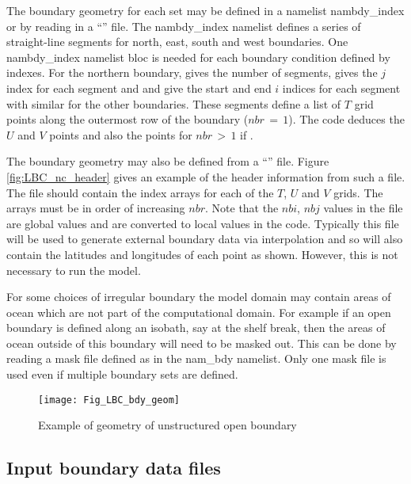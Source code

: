 \documentclass[../main/NEMO_manual]{subfiles}
\begin{document}
The boundary geometry for each set may be defined in a namelist nambdy\_index or
by reading in a ``'' file.
The nambdy\_index namelist defines a series of straight-line segments for north, east, south and west boundaries.
One nambdy\_index namelist bloc is needed for each boundary condition defined by indexes. 
For the northern boundary,  gives the number of segments,
 gives the $j$ index for each segment and  and
 give the start and end $i$ indices for each segment with similar for the other boundaries.
These segments define a list of $T$ grid points along the outermost row of the boundary ($nbr\,=\, 1$).
The code deduces the $U$ and $V$ points and also the points for $nbr\,>\, 1$ if .

The boundary geometry may also be defined from a ``'' file.
Figure \autoref{fig:LBC_nc_header} gives an example of the header information from such a file.
The file should contain the index arrays for each of the $T$, $U$ and $V$ grids.
The arrays must be in order of increasing $nbr$.
Note that the $nbi$, $nbj$ values in the file are global values and are converted to local values in the code.
Typically this file will be used to generate external boundary data via interpolation and so
will also contain the latitudes and longitudes of each point as shown.
However, this is not necessary to run the model. 

For some choices of irregular boundary the model domain may contain areas of ocean which
are not part of the computational domain.
For example if an open boundary is defined along an isobath, say at the shelf break,
then the areas of ocean outside of this boundary will need to be masked out.
This can be done by reading a mask file defined as  in the nam\_bdy namelist.
Only one mask file is used even if multiple boundary sets are defined.

\begin{figure}[!t]
  \begin{center}
    \texttt{[image: Fig\_LBC\_bdy\_geom]}
    \caption {
      \protect\label{fig:LBC_bdy_geom}
      Example of geometry of unstructured open boundary
    }
  \end{center}
\end{figure}

\subsection{Input boundary data files}
\label{subsec:BDY_data}
\end{document}
